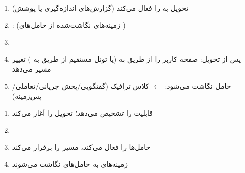 \begin{enumerate}
\def\labelenumi{\arabic{enumi}.}
\tightlist
\item
   تحویل به  را فعال می‌کند (گزارش‌های اندازه‌گیری یا پوشش)
\item
  :  (زمینه‌های  نگاشت‌شده از حامل‌های )
\item
\item
  پس از تحویل:  صفحه کاربر را از طریق  به  (یا تونل مستقیم از طریق  به ) تغییر مسیر می‌دهد
\item
   حامل نگاشت می‌شود:  \ensuremath{\leftarrow} کلاس ترافیک  (گفتگویی/\allowbreak{}پخش جریانی/\allowbreak{}تعاملی/\allowbreak{}پس‌زمینه)
\end{enumerate}


\begin{enumerate}
\def\labelenumi{\arabic{enumi}.}
\tightlist
\item
   قابلیت  را تشخیص می‌دهد؛ تحویل را آغاز می‌کند
\item
\item
   حامل‌ها را فعال می‌کند، مسیر  را برقرار می‌کند
\item
  زمینه‌های  به حامل‌های  نگاشت می‌شوند
\end{enumerate}




\CNchained{}

